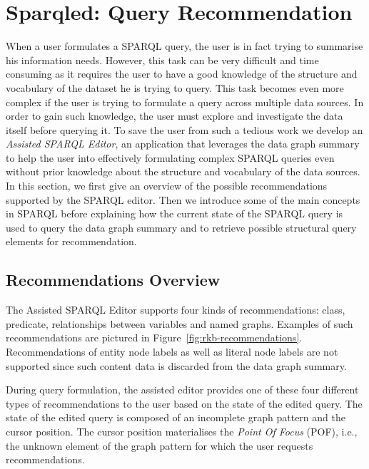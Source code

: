 \section{Sparqled: Query Recommendation}
\label{sec:exploiting:sparqled:recommendation}

When a user formulates a SPARQL query, the user is in fact trying to summarise his information needs. However, this task can be very difficult and time consuming as it requires the user to have a good knowledge of the structure and vocabulary of the dataset he is trying to query. This task becomes even more complex if the user is trying to formulate a query across multiple data sources. In order to gain such knowledge, the user must explore and investigate the data itself before querying it. To save the user from such a tedious work we develop an \emph{Assisted SPARQL Editor}, an application that leverages the data graph summary to help the user into effectively formulating complex SPARQL queries even without prior knowledge about the structure and vocabulary of the data sources. In this section, we first give an overview of the possible recommendations supported by the SPARQL editor. Then we introduce some of the main concepts in SPARQL before explaining how the current state of the SPARQL query is used to query the data graph summary and to retrieve possible structural query elements for recommendation.

\subsection{Recommendations Overview}

The Assisted SPARQL Editor supports four kinds of recommendations: class, predicate, relationships between variables and named graphs. Examples of such recommendations are pictured in Figure~\ref{fig:rkb-recommendations}. Recommendations of entity node labels as well as literal node labels are not supported since such content data is discarded from the data graph summary.

During query formulation, the assisted editor provides one of these four different types of recommendations to the user based on the state of the edited query. The state of the edited query is composed of an incomplete graph pattern and the cursor position. The cursor position materialises the \emph{Point Of Focus} (POF), i.e., the unknown element of the graph pattern for which the user requests recommendations. 


